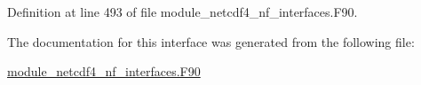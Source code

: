 Definition at line 493 of file module\+\_\+netcdf4\+\_\+nf\+\_\+interfaces.\+F90.



The documentation for this interface was generated from the following file\+:\begin{DoxyCompactItemize}
\item 
\hyperlink{module__netcdf4__nf__interfaces_8F90}{module\+\_\+netcdf4\+\_\+nf\+\_\+interfaces.\+F90}\end{DoxyCompactItemize}
